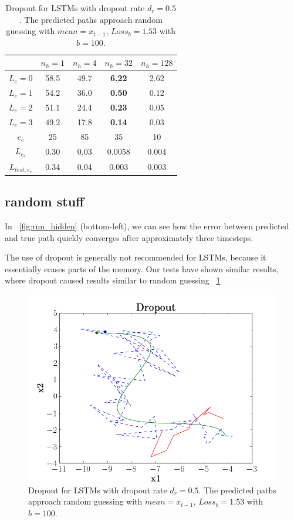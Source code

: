 \begin{table}[]
\centering
\begin{tabular}{ c| c| c| c| c}
& $n_h=1$ & $n_h=4$ &$n_h=32$ & $n_h=128$\\
\hline
$L_e=0$ & 58.5 & 49.7  & \textbf{6.22} & 2.62      \\
$L_e=1$ & 54.2 & 36.0  & \textbf{0.50} & 0.12      \\
$L_e=2$ & 51.1 & 24.4  & \textbf{0.23} & 0.05      \\
$L_e=3$ & 49.2 & 17.8  & \textbf{0.14} & 0.03      \\
\hline
$e_c$ 			& 25 	& 85 	& 35	& 10 		\\
$L_{e_c}$		&  0.30	& 0.03	& 0.0058& 0.004 	\\
$L_{test, e_c}$	& 0.34	& 0.04	&0.003	& 0.003 	\\     
\end{tabular}



\subsection{random stuff}


In ~\cref{fig:rnn_hidden} (bottom-left), we can see how the error between predicted and true path quickly converges after approximately three timesteps.

The use of dropout is generally not recommended for LSTMs, because it essentially erases parts of the memory. Our tests have shown similar results, where dropout caused results similar to random guessing ~\cref{fig:rnn_dropout}

\begin{figure}
	\centering
	\includegraphics [trim=0 0 0 0, clip, angle=0, width=1.0\columnwidth,
	keepaspectratio]{figures/rnn_dropout}
	\caption{Dropout for LSTMs with dropout rate $d_r = 0.5$. The predicted paths approach random guessing with $mean = x_{t-1}$, $Loss_b = 1.53$ with $b=100$.}
	\label{fig:rnn_dropout}
\end{figure}


\end{table}
